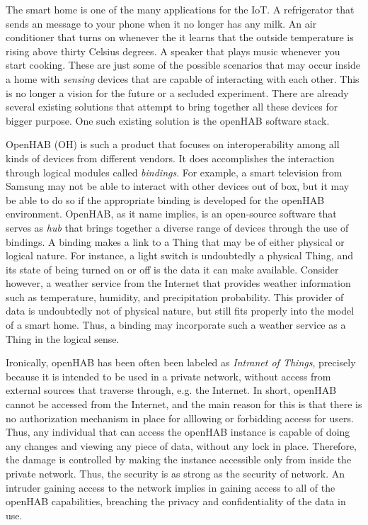 \documentclass[12pt]{article}
\newcommand{\TODO}{\todo[inline]}
\begin{document}
The smart home is one of the many applications for the IoT. A refrigerator that sends an message to your phone when it no longer has any milk. An air conditioner that turns on whenever the it learns that the outside temperature is rising above thirty Celsius degrees. A speaker that plays music whenever you start cooking. These are just some of the possible scenarios that may occur inside a home with \emph{sensing} devices that are capable of interacting with each other. This is no longer a vision for the future or a secluded experiment. There are already several existing solutions that attempt to bring together all these devices for bigger purpose. One such existing solution is the openHAB software stack.

OpenHAB (OH) is such a product that focuses on interoperability among all kinds of devices from different vendors. It does accomplishes the interaction through logical modules called \emph{bindings}. For example, a smart television from Samsung may not be able to interact with other devices out of box, but it may be able to do so if the appropriate binding is developed for the openHAB environment. OpenHAB, as it name implies, is an open-source software that serves as \emph{hub} that brings together a diverse range of devices through the use of bindings. A binding makes a link to a Thing that may be of either physical or logical nature. For instance, a light switch is undoubtedly a physical Thing, and its state of being turned on or off is the data it can make available. Consider however, a weather service from the Internet that provides weather information such as temperature, humidity, and precipitation probability. This provider of data is undoubtedly not of physical nature, but still fits properly into the model of a smart home. Thus, a binding may incorporate such a weather service as a Thing in the logical sense.

\TODO{Do I need reference here?}
Ironically, openHAB has been often been labeled as \emph{Intranet of Things}, precisely because it is intended to be used in a private network, without access from external sources that traverse through, e.g. the Internet. In short, openHAB cannot be accessed from the Internet, and the main reason for this is that there is no authorization mechanism in place for alllowing or forbidding access for users. Thus, any individual that can access the openHAB instance is capable of doing any changes and viewing any piece of data, without any lock in place. Therefore, the damage is controlled by making the instance accessible only from inside the private network. Thus, the security is as strong as the security of network. An intruder gaining access to the network implies in gaining access to all of the openHAB capabilities, breaching the privacy and confidentiality of the data in use. 
\end{document}
